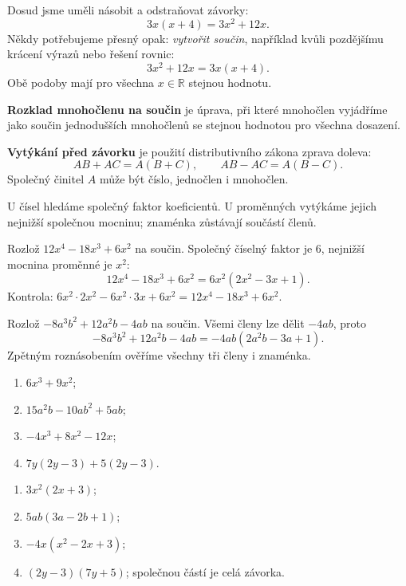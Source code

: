 \documentclass[11pt,a4paper]{article}
\begin{document}
Dosud jsme uměli násobit a odstraňovat závorky:
\[3x(x+4)=3x^2+12x.\]
Někdy potřebujeme přesný opak: \emph{vytvořit součin}, například kvůli pozdějšímu krácení výrazů nebo řešení rovnic:
\[3x^2+12x=3x(x+4).\]
Obě podoby mají pro všechna $x\in\mathbb R$ stejnou hodnotu.
\begin{definiceBox}[title={Definice - Rozklad mnohočlenu na součin}]
\textbf{Rozklad mnohočlenu na součin} je úprava, při které mnohočlen vyjádříme jako součin jednodušších mnohočlenů se stejnou hodnotou pro všechna dosazení.
\end{definiceBox}
\begin{zadaniBox}[title={Věta - Vytýkání společného činitele}]
\textbf{Vytýkání před závorku} je použití distributivního zákona zprava doleva:
\[AB+AC=A(B+C),\qquad AB-AC=A(B-C).\]
Společný činitel $A$ může být číslo, jednočlen i mnohočlen.
\end{zadaniBox}
U čísel hledáme společný faktor koeficientů. U proměnných vytýkáme jejich nejnižší společnou mocninu; znaménka zůstávají součástí členů.
\begin{prikladReseniBox}[breakable=false,title={Příklad 1}]
Rozlož $12x^4-18x^3+6x^2$ na součin.
\tcblower
Společný číselný faktor je $6$, nejnižší mocnina proměnné je $x^2$:
\[12x^4-18x^3+6x^2=6x^2(2x^2-3x+1).\]
Kontrola: $6x^2\cdot 2x^2-6x^2\cdot3x+6x^2=12x^4-18x^3+6x^2$.
\end{prikladReseniBox}
\begin{prikladReseniBox}[breakable=false,title={Příklad 2}]
Rozlož $-8a^3b^2+12a^2b-4ab$ na součin.
\tcblower
Všemi členy lze dělit $-4ab$, proto
\[-8a^3b^2+12a^2b-4ab=-4ab(2a^2b-3a+1).\]
Zpětným roznásobením ověříme všechny tři členy i znaménka.
\end{prikladReseniBox}
\newpage
\begin{zadaniReseniBox}[breakable=false,title={Samostatná práce 1}]
\begin{enumerate}[label=\alph*)]
\item $6x^3+9x^2$;
\item $15a^2b-10ab^2+5ab$;
\item $-4x^3+8x^2-12x$;
\item $7y(2y-3)+5(2y-3)$.
\end{enumerate}
\tcblower
\begin{enumerate}[label=\alph*)]
\item $3x^2(2x+3)$;
\item $5ab(3a-2b+1)$;
\item $-4x(x^2-2x+3)$;
\item $(2y-3)(7y+5)$; společnou částí je celá závorka.
\end{enumerate}
\end{zadaniReseniBox}
\end{document}
